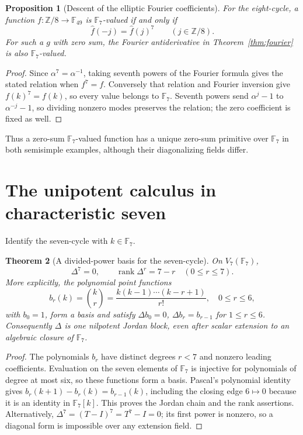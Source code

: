 \documentclass[11pt]{article}
\newtheorem{theorem}{Theorem}[section]
\newtheorem{proposition}[theorem]{Proposition}
\theoremstyle{definition}
\theoremstyle{remark}
\newcommand{\F}{\mathbb F}
\begin{document}
\begin{proposition}[Descent of the elliptic Fourier coefficients]
\label{prop:frobenius}
For the eight-cycle, a function $f:\mathbb Z/8\to\F_{49}$ is $\F_7$-valued
if and only if
\[
 \widehat f(-j)=\widehat f(j)^7\qquad(j\in\mathbb Z/8).
\]
For such a $g$ with zero sum, the Fourier antiderivative in
Theorem~\ref{thm:fourier} is also $\F_7$-valued.
\end{proposition}
\begin{proof}
Since $\alpha^7=\alpha^{-1}$, taking seventh powers of the Fourier formula
gives the stated relation when $f^7=f$. Conversely that relation and Fourier
inversion give $f(k)^7=f(k)$, so every value belongs to $\F_7$.
Seventh powers send $\alpha^j-1$ to $\alpha^{-j}-1$, so dividing nonzero
modes preserves the relation; the zero coefficient is fixed as well.
\end{proof}
Thus a zero-sum $\F_7$-valued function has a unique zero-sum primitive over
$\F_7$ in both semisimple examples, although their diagonalizing fields differ.

\section{The unipotent calculus in characteristic seven}
Identify the seven-cycle with $k\in\F_7$.
\begin{theorem}[A divided-power basis for the seven-cycle]
\label{thm:unipotent}
On $V_7(\F_7)$,
\[
 \Delta^7=0,\qquad \operatorname{rank}\Delta^r=7-r
       \quad(0\le r\le7).
\]
More explicitly, the polynomial point functions
\[
 b_r(k)=\binom{k}{r}
       =\frac{k(k-1)\cdots(k-r+1)}{r!},\quad0\le r\le6,
\]
with $b_0=1$, form a basis and satisfy
$\Delta b_0=0$, $\Delta b_r=b_{r-1}$ for $1\le r\le6$.
Consequently $\Delta$ is one nilpotent Jordan block, even after scalar
extension to an algebraic closure of $\F_7$.
\end{theorem}
\begin{proof}
The polynomials $b_r$ have distinct degrees $r<7$ and nonzero leading
coefficients. Evaluation on the seven elements of $\F_7$ is injective for
polynomials of degree at most six, so these functions form a basis.
Pascal's polynomial identity gives $b_r(k+1)-b_r(k)=b_{r-1}(k)$, including
the closing edge $6\mapsto0$ because it is an identity in $\F_7[k]$.
This proves the Jordan chain and the rank assertions. Alternatively,
$\Delta^7=(T-I)^7=T^7-I=0$; its first power is nonzero, so a diagonal form
is impossible over any extension field.
\end{proof}
\end{document}
